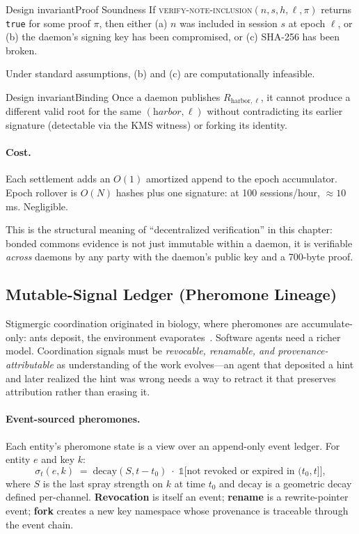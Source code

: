 \documentclass[11pt,a4paper]{article}
\theoremstyle{definition}
\theoremstyle{remark}
\begin{document}
\begin{pdclaim}{Design invariant}{Proof Soundness}
\setlength{\parskip}{4pt plus 1pt}
\label{prop:proof-sound}
If \textsc{verify-note-inclusion}$(n,s,h,\ell,\pi)$ returns \texttt{true} for some proof $\pi$, then either (a) $n$ was included in session $s$ at epoch $\ell$, or (b) the daemon's signing key has been compromised, or (c) SHA-256 has been broken. 

Under standard assumptions, (b) and (c) are computationally infeasible.
\end{pdclaim}

\begin{pdclaim}{Design invariant}{Binding}
\setlength{\parskip}{4pt plus 1pt}
\label{prop:forest-bind}
Once a daemon publishes $R_{\text{harbor},\ell}$, it cannot produce a different valid root for the same $(\textit{harbor},\ell)$ without contradicting its earlier signature (detectable via the KMS witness) or forking its identity.
\end{pdclaim}

\paragraph{Cost.} Each settlement adds an $O(1)$ amortized append to the epoch accumulator. Epoch rollover is $O(N)$ hashes plus one signature: at 100 sessions/hour, $\approx 10$ms. Negligible.

This is the structural meaning of ``decentralized verification'' in this chapter: bonded commons evidence is not just immutable within a daemon, it is verifiable \emph{across} daemons by any party with the daemon's public key and a 700-byte proof.

\subsection{Mutable-Signal Ledger (Pheromone Lineage)}\label{sec:pheromones}

Stigmergic coordination originated in biology, where pheromones are accumulate-only: ants deposit, the environment evaporates~. Software agents need a richer model. Coordination signals must be \emph{revocable, renamable, and provenance-attributable} as understanding of the work evolves---an agent that deposited a hint and later realized the hint was wrong needs a way to retract it that preserves attribution rather than erasing it.

\paragraph{Event-sourced pheromones.} Each entity's pheromone state is a view over an append-only event ledger. For entity $e$ and key $k$:
\[
\sigma_t(e,k) \;=\; \mathrm{decay}(S, t - t_0)\;\cdot\;\mathbb{1}\bigl[\text{not revoked or expired in }(t_0, t]\bigr],
\]
where $S$ is the last spray strength on $k$ at time $t_0$ and $\mathrm{decay}$ is a geometric decay defined per-channel. \textbf{Revocation} is itself an event; \textbf{rename} is a rewrite-pointer event; \textbf{fork} creates a new key namespace whose provenance is traceable through the event chain.
\end{document}
